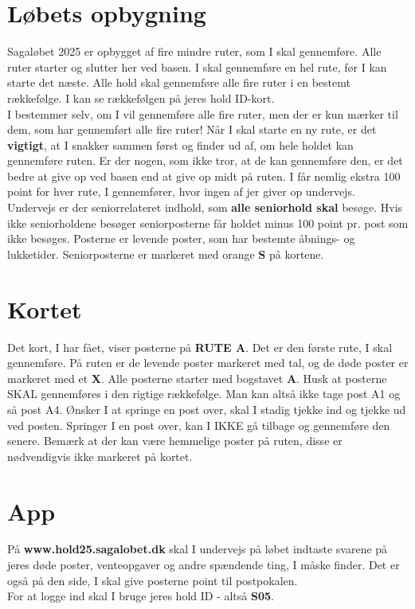 \section{Løbets opbygning}
Sagaløbet 2025 er opbygget af fire mindre ruter, som I skal gennemføre. Alle ruter starter og slutter her ved basen. I skal gennemføre en hel rute, før I kan starte det næste. Alle hold skal gennemføre alle fire ruter i en bestemt rækkefølge. I kan se rækkefølgen på jeres hold ID-kort.\\\newline
I bestemmer selv, om I vil gennemføre alle fire ruter, men der er kun mærker til dem, som har gennemført alle fire ruter! Når I skal starte en ny rute, er det \textbf{vigtigt}, at I snakker sammen først og finder ud af, om hele holdet kan gennemføre ruten. Er der nogen, som ikke tror, at de kan gennemføre den, er det bedre at give op ved basen end at give op midt på ruten. I får nemlig ekstra 100 point for hver rute, I gennemfører, hvor ingen af jer giver op undervejs.\\
\newline
Undervejs er der seniorrelateret indhold, som \textbf{alle seniorhold skal} besøge. Hvis ikke seniorholdene besøger seniorposterne får holdet minus 100 point pr. post som ikke besøges. Posterne er levende poster, som har bestemte åbnings- og lukketider. Seniorposterne er markeret med orange \textbf{S} på kortene.\\
\newline
\section{Kortet}
Det kort, I har fået, viser posterne på \textbf{RUTE A}. Det er den første rute, I skal gennemføre. På ruten er de levende poster markeret med tal, og de døde poster er markeret med et \textbf{X}. Alle posterne starter med bogstavet \textbf{A}. Husk at posterne SKAL gennemføres i den rigtige rækkefølge. Man kan altså ikke tage post A1 og så post A4. Ønsker I at springe en post over, skal I stadig tjekke ind og tjekke ud ved posten. Springer I en post over, kan I IKKE gå tilbage og gennemføre den senere. Bemærk at der kan være hemmelige poster på ruten, disse er nødvendigvis ikke markeret på kortet.
\section{App}
På \textbf{www.hold25.sagalobet.dk} skal I undervejs på løbet indtaste svarene på jeres døde poster, venteopgaver og andre spændende ting, I måske finder. Det er også på den side, I skal give posterne point til postpokalen.\\
For at logge ind skal I bruge jeres hold ID - altså \textbf{S05}.
\newpage
